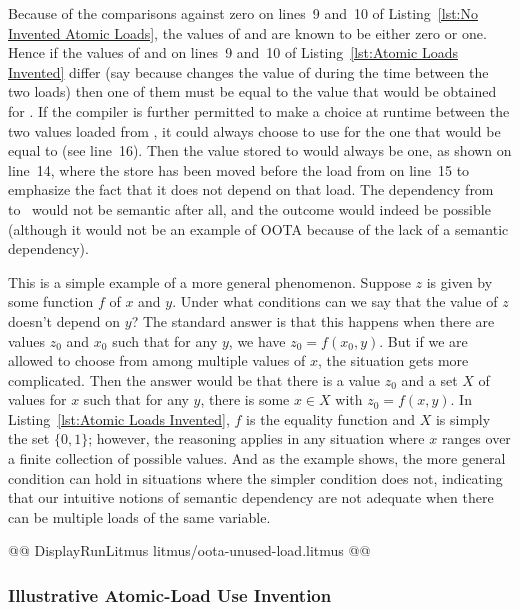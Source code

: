 \documentclass[10]{article}
\begin{document}
Because of the comparisons against zero on lines~9 and~10 of
Listing~\ref{lst:No Invented Atomic Loads},
the values of  and  are known to be either zero or one.
Hence if the values of  and  on lines~9 and~10 of
Listing~\ref{lst:Atomic Loads Invented}
differ (say because  changes the value of 
during the time between the two loads)
then one of them must be equal to the value that would
be obtained for .
If the compiler is further permitted to make a choice at runtime
between the two values loaded from , it could always choose
to use for  the one that would be equal to  (see line~16).
Then the value stored to  would always be one,
as shown on line~14, where the store has been moved before
the load from  on line~15 to emphasize the fact that
it does not depend on that load.
The dependency from~ to~ would not be semantic after all,
and the outcome  would indeed be possible
(although it would not be an example of OOTA because of the lack of a
semantic dependency).

This is a simple example of a more general phenomenon.
Suppose $z$ is given by some function $f$ of $x$ and $y$.
Under what conditions can we say that the value of $z$ doesn't depend
on $y$?
The standard answer is that this happens when there are values
$z_0$ and $x_0$ such that for any $y$, we have $z_0 = f(x_0, y)$.
But if we are allowed to choose from among multiple values of $x$,
the situation gets more complicated.
Then the answer would be that there is a value $z_0$ and
a set $X$ of values for $x$ such that for any $y$, there is some
$x \in X$ with $z_0 = f(x, y)$.
In Listing~\ref{lst:Atomic Loads Invented},
$f$ is the equality function and $X$ is simply the set $\{0, 1\}$;
however, the reasoning applies in any situation where $x$ ranges
over a finite collection of possible values.
And as the example shows, the more general condition can hold in situations
where the simpler condition does not, indicating that our intuitive
notions of semantic dependency are not adequate when there can be
multiple loads of the same variable.

\begin{listing}[tbp]
@@ DisplayRunLitmus litmus/oota-unused-load.litmus @@
\caption{Unused Extra Atomic Load}
\label{lst:Unused Extra Atomic Load}
\end{listing}

\subsubsection{Illustrative Atomic-Load Use Invention}
\label{app:Illustrative Atomic-Load Use Invention}
\end{document}
